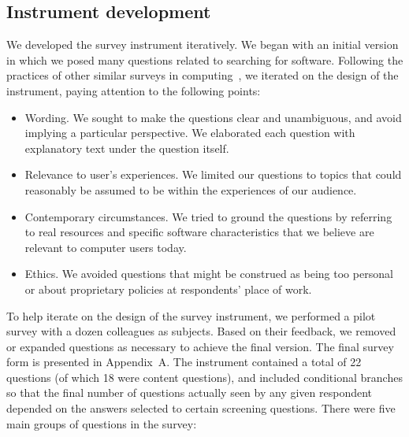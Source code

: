 \documentclass{casicswhitepaper}
\begin{document}
\subsection{Instrument development}

We developed the survey instrument iteratively.  We began with an initial version in which we posed many questions related to searching for software.  Following the practices of other similar surveys in computing~\cite[e.g.,][]{varnellsarjeant2015comparing}, we iterated on the design of the instrument, paying attention to the following points:

\begin{itemize}

\item Wording.  We sought to make the questions clear and unambiguous, and avoid implying a particular perspective.  We elaborated each question with explanatory text under the question itself.

\item Relevance to user's experiences.  We limited our questions to topics that could reasonably be assumed to be within the experiences of our audience.

\item Contemporary circumstances.  We tried to ground the questions by referring to real resources and specific software characteristics that we believe are relevant to computer users today.

\item Ethics.  We avoided questions that might be construed as being too personal or about proprietary policies at respondents' place of work.

\end{itemize}

To help iterate on the design of the survey instrument, we performed a pilot survey with a dozen colleagues as subjects.  Based on their feedback, we removed or expanded questions as necessary to achieve the final version.  The final survey form is presented in Appendix~A.  The instrument contained a total of 22 questions (of which 18 were content questions), and included conditional branches so that the final number of questions actually seen by any given respondent depended on the answers selected to certain screening questions.  There were five main groups of questions in the survey:
\end{document}
